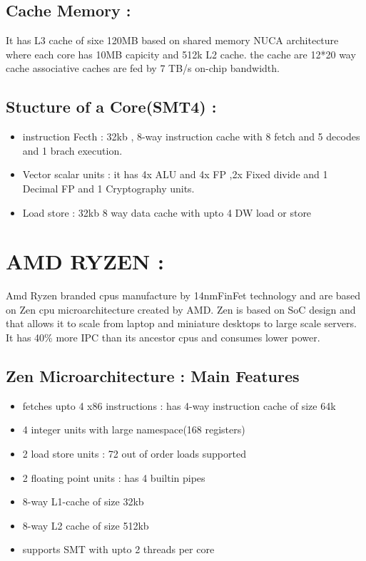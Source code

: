 \documentclass[a4paper,10pt]{article}
\begin{document}
\subsection{Cache Memory :}
It has L3 cache of sixe 120MB based on shared memory NUCA architecture  where each core has 10MB capicity and 512k L2 cache. the cache are 12*20 way cache associative caches are fed by 7 TB/s on-chip bandwidth.

\subsection{Stucture of a Core(SMT4) :}
\begin{itemize}
 \item instruction Fecth : 32kb , 8-way instruction cache with 8 fetch and 5 decodes and 1 brach execution.
 \item Vector scalar units : it has 4x ALU and 4x FP ,2x Fixed divide and 1 Decimal FP and 1 Cryptography units.
 \item Load store : 32kb 8 way data cache with upto 4 DW load or store
\end{itemize}


\section{ AMD RYZEN :}
Amd Ryzen branded cpus manufacture by 14nmFinFet technology and are based on Zen cpu microarchitecture created by AMD. Zen is based on SoC design and that allows it to scale from laptop and miniature desktops to large scale servers. It has 40\% more IPC than its ancestor cpus and consumes lower power.
\subsection{Zen Microarchitecture : Main Features}
\begin{itemize}
 \item fetches upto 4 x86 instructions : has 4-way instruction cache of size 64k 
 \item 4 integer units with large namespace(168 registers)
 \item 2 load store units : 72 out of order loads supported
 \item 2 floating point units : has 4 builtin pipes
 \item 8-way L1-cache of size 32kb
 \item 8-way L2 cache of size 512kb
 \item supports SMT with upto 2 threads per core
\end{itemize}
\end{document}
